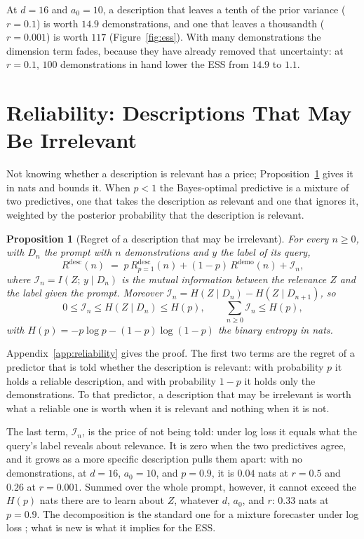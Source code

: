 \documentclass{article}
\newtheorem{proposition}[theorem]{Proposition}
\begin{document}
At $d = 16$ and $a_0 = 10$, a description that leaves a tenth of the prior variance ($r = 0.1$) is worth $14.9$ demonstrations, and one that leaves a thousandth ($r = 0.001$) is worth $117$ (Figure~\ref{fig:ess}). With many demonstrations the dimension term fades, because they have already removed that uncertainty: at $r = 0.1$, $100$ demonstrations in hand lower the ESS from $14.9$ to $1.1$.

\section{Reliability: Descriptions That May Be Irrelevant}\label{sec:reliability}
Not knowing whether a description is relevant has a price; Proposition~\ref{prop:unreliable} gives it in nats and bounds it. When $p < 1$ the Bayes-optimal predictive is a mixture of two predictives, one that takes the description as relevant and one that ignores it, weighted by the posterior probability that the description is relevant.

\begin{proposition}[Regret of a description that may be irrelevant]\label{prop:unreliable}
For every $n \ge 0$, with $D_n$ the prompt with $n$ demonstrations and $y$ the label of its query,
\begin{equation}\label{eq:decomp}
    R^{\mathrm{desc}}(n) \;=\; p\, R^{\mathrm{desc}}_{p=1}(n) + (1-p)\, R^{\mathrm{demo}}(n) + \mathcal{I}_n,
\end{equation}
where $\mathcal{I}_n = I(Z;\, y \mid D_n)$ is the mutual information between the relevance $Z$ and the label given the prompt. Moreover $\mathcal{I}_n = H(Z \mid D_n) - H(Z \mid D_{n+1})$, so
\[ 0 \le \mathcal{I}_n \le H(Z \mid D_n) \le H(p), \qquad \textstyle\sum_{n \ge 0} \mathcal{I}_n \le H(p), \]
with $H(p) = -p\log p - (1-p)\log(1-p)$ the binary entropy in nats.
\end{proposition}
Appendix~\ref{app:reliability} gives the proof. The first two terms are the regret of a predictor that is told whether the description is relevant: with probability $p$ it holds a reliable description, and with probability $1-p$ it holds only the demonstrations. To that predictor, a description that may be irrelevant is worth what a reliable one is worth when it is relevant and nothing when it is not.

The last term, $\mathcal{I}_n$, is the price of not being told: under log loss it equals what the query's label reveals about relevance. It is zero when the two predictives agree, and it grows as a more specific description pulls them apart: with no demonstrations, at $d = 16$, $a_0 = 10$, and $p = 0.9$, it is $0.04$ nats at $r = 0.5$ and $0.26$ at $r = 0.001$. Summed over the whole prompt, however, it cannot exceed the $H(p)$ nats there are to learn about $Z$, whatever $d$, $a_0$, and $r$: $0.33$ nats at $p = 0.9$. The decomposition is the standard one for a mixture forecaster under log loss \citep{cesabianchi2006, merhav1998}; what is new is what it implies for the ESS.
\end{document}
